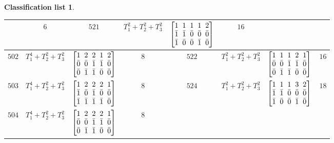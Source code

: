\documentclass[10pt,a4paper]{amsart}
\theoremstyle{definition}
\newtheorem{class-list}[thm]{Classification list}
\numberwithin{equation}{section}
\begin{document}
\begin{class-list}
\begin{table}[h!]
\begin{tabu}{c|c|c|c||c|c|c|c}
&${6}$
&${521}$&${T_{1}^{2}+T_{2}^{2}+T_{3}^{2}}$
&$\arraycolsep=1mm\begin{bmatrix}{1} & {1} & {1} & {1} & {2} \\ {\bar{1}} & {\bar{1}} & {\bar{0}} & {\bar{0}} & {\bar{0}} \\ {\bar{1}} & {\bar{0}} & {\bar{0}} & {\bar{1}} & {\bar{0}}\end{bmatrix}$
&${16}$
\\
\hline
${502}$&${T_{1}^{4}+T_{2}^{2}+T_{3}^{2}}$
&$\arraycolsep=1mm\begin{bmatrix}{1} & {2} & {2} & {1} & {2} \\ {\bar{0}} & {\bar{0}} & {\bar{1}} & {\bar{1}} & {\bar{0}} \\ {\bar{0}} & {\bar{1}} & {\bar{1}} & {\bar{0}} & {\bar{0}}\end{bmatrix}$
&${8}$
&${522}$&${T_{1}^{2}+T_{2}^{2}+T_{3}^{2}}$
&$\arraycolsep=1mm\begin{bmatrix}{1} & {1} & {1} & {2} & {1} \\ {\bar{0}} & {\bar{0}} & {\bar{1}} & {\bar{1}} & {\bar{0}} \\ {\bar{0}} & {\bar{1}} & {\bar{1}} & {\bar{0}} & {\bar{0}}\end{bmatrix}$
&${16}$
\\
\hline
${503}$&
${T_{1}^{4}+T_{2}^{2}+T_{3}^{2}}$
&$\arraycolsep=1mm\begin{bmatrix}{1} & {2} & {2} & {2} & {1} \\ {\bar{1}} & {\bar{0}} & {\bar{1}} & {\bar{0}} & {\bar{0}} \\ {\bar{1}} & {\bar{1}} & {\bar{1}} & {\bar{1}} & {\bar{0}}\end{bmatrix}$
&${8}$
&${524}$&${T_{1}^{2}+T_{2}^{2}+T_{3}^{2}}$
&$\arraycolsep=1mm\begin{bmatrix}{1} & {1} & {1} & {3} & {2} \\ {\bar{1}} & {\bar{1}} & {\bar{0}} & {\bar{0}} & {\bar{0}} \\ {\bar{1}} & {\bar{0}} & {\bar{0}} & {\bar{1}} & {\bar{0}}\end{bmatrix}$
&${18}$
\\
\hline
${504}$&${T_{1}^{4}+T_{2}^{2}+T_{3}^{2}}$
&$\arraycolsep=1mm\begin{bmatrix}{1} & {2} & {2} & {2} & {1} \\ {\bar{0}} & {\bar{0}} & {\bar{1}} & {\bar{1}} & {\bar{0}} \\ {\bar{0}} & {\bar{1}} & {\bar{1}} & {\bar{0}} & {\bar{0}}\end{bmatrix}$
&${8}$
\\
\end{tabu}%
\end{table}
\end{class-list}
\end{document}
